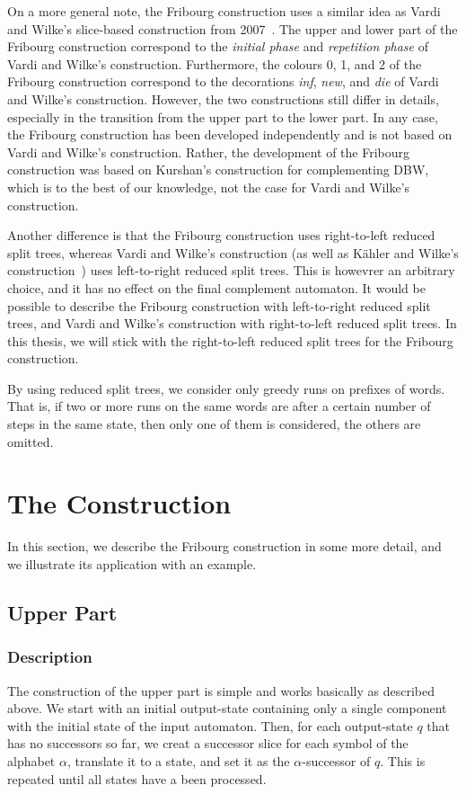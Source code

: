 On a more general note, the Fribourg construction uses a similar idea as Vardi and Wilke's slice-based construction from 2007~\cite{vardi2007automata}. The upper and lower part of the Fribourg construction correspond to the \textit{initial phase} and \textit{repetition phase} of Vardi and Wilke's construction. Furthermore, the colours 0, 1, and 2 of the Fribourg construction correspond to the decorations \textit{inf}, \textit{new}, and \textit{die} of Vardi and Wilke's construction. However, the two constructions still differ in details, especially in the transition from the upper part to the lower part. In any case, the Fribourg construction has been developed independently and is not based on Vardi and Wilke's construction. Rather, the development of the Fribourg construction was based on Kurshan's construction for complementing DBW, which is to the best of our knowledge, not the case for Vardi and Wilke's construction.

Another difference is that the Fribourg construction uses right-to-left reduced split trees, whereas Vardi and Wilke's construction (as well as Kähler and Wilke's construction~\cite{2008_kaehler}) uses left-to-right reduced split trees. This is howevrer an arbitrary choice, and it has no effect on the final complement automaton. It would be possible to describe the Fribourg construction with left-to-right reduced split trees, and Vardi and Wilke's construction with right-to-left reduced split trees. In this thesis, we will stick with the right-to-left reduced split trees for the Fribourg construction.

By using reduced split trees, we consider only greedy runs on prefixes of words. That is, if two or more runs on the same words are after a certain number of steps in the same state, then only one of them is considered, the others are omitted. 


\section{The Construction}
\label{3_construction}
In this section, we describe the Fribourg construction in some more detail, and we illustrate its application with an example. 


\subsection{Upper Part}

\subsubsection{Description}
The construction of the upper part is simple and works basically as described above. We start with an initial output-state containing only a single component with the initial state of the input automaton. Then, for each output-state $q$ that has no successors so far, we creat a successor slice for each symbol of the alphabet $\alpha$, translate it to a state, and set it as the $\alpha$-successor of $q$. This is repeated until all states have a been processed.

